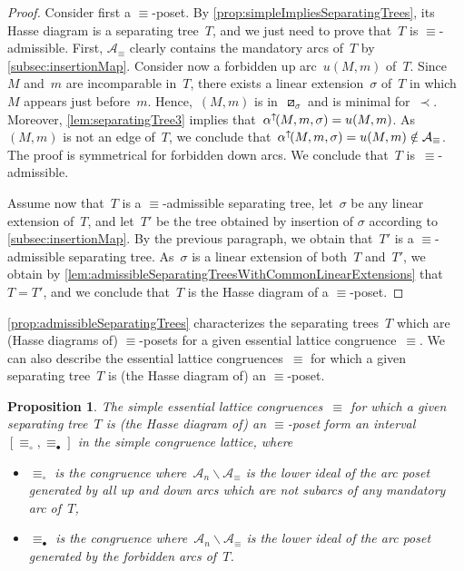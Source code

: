 \documentclass{amsart}
\newtheorem{proposition}[theorem]{Proposition}
\theoremstyle{definition}
\newcommand{\ssm}{\smallsetminus} %
\newcommand{\eqdef}{\mbox{\,\raisebox{0.2ex}{\scriptsize\ensuremath{\mathrm:}}\ensuremath{=}\,}} %
\newcommand{\darkblue}{\color{darkblue}} %
\newcommand{\defn}[1]{\textsl{\darkblue #1}} %
\newcommand{\arc}{\alpha} %
\newcommand{\arcs}{{\mathcal{A}}} %
\newcommand{\arcUp}{\smash{\alpha^{\uparrow\!}}} %
\begin{document}
\begin{proof}
Consider first a $\equiv$-poset.
By \cref{prop:simpleImpliesSeparatingTrees}, its Hasse diagram is a separating tree~$T$, and we just need to prove that~$T$ is $\equiv$-admissible.
First, $\arcs_\equiv$ clearly contains the mandatory arcs of~$T$ by \cref{subsec:insertionMap}.
Consider now a forbidden up arc~$u(M,m)$ of~$T$.
Since~$M$ and~$m$ are incomparable in~$T$, there exists a linear extension~$\sigma$ of~$T$ in which~$M$ appears just before~$m$.
Hence,~$(M,m)$ is in~$\boxslash_\sigma$ and is minimal for~$\prec$.
Moreover, \cref{lem:separatingTree3} implies that~${\arcUp(M, m, \sigma) = u(M,m)}$.
As~$(M,m)$ is not an edge of~$T$, we conclude that~${\arcUp(M, m, \sigma) = u(M,m) \notin \arcs_\equiv}$.
The proof is symmetrical for forbidden down arcs.
We conclude that~$T$ is~$\equiv$-admissible.

Assume now that~$T$ is a $\equiv$-admissible separating tree, let~$\sigma$ be any linear extension of~$T$, and let~$T'$ be the tree obtained by insertion of $\sigma$ according to \cref{subsec:insertionMap}.
By the previous paragraph, we obtain that~$T'$ is a $\equiv$-admissible separating tree.
As~$\sigma$ is a linear extension of both~$T$ and~$T'$, we obtain by \cref{lem:admissibleSeparatingTreesWithCommonLinearExtensions} that~$T = T'$, and we conclude that~$T$ is the Hasse diagram of a $\equiv$-poset.
\end{proof}

\cref{prop:admissibleSeparatingTrees} characterizes the separating trees~$T$ which are (Hasse diagrams of) $\equiv$-posets for a given essential lattice congruence~$\equiv$.
We can also describe the essential lattice congruences~$\equiv$ for which a given separating tree~$T$ is (the Hasse diagram of) an $\equiv$-poset.

\begin{proposition}
\label{prop:whichCongruences}
The simple essential lattice congruences~$\equiv$ for which a given separating tree~$T$ is (the Hasse diagram of) an $\equiv$-poset form an interval~$[\equiv_\circ, \equiv_\bullet]$ in the simple congruence lattice, where
\begin{itemize}
\item $\equiv_\circ$ is the congruence where~$\arcs_n \ssm \arcs_\equiv$ is the lower ideal of the arc poset generated by all up and down arcs which are not subarcs of any mandatory arc of~$T$,
\item $\equiv_\bullet$ is the congruence where~$\arcs_n \ssm \arcs_\equiv$ is the lower ideal of the arc poset generated by the forbidden arcs of~$T$.
\end{itemize}
\end{proposition}
\end{document}

